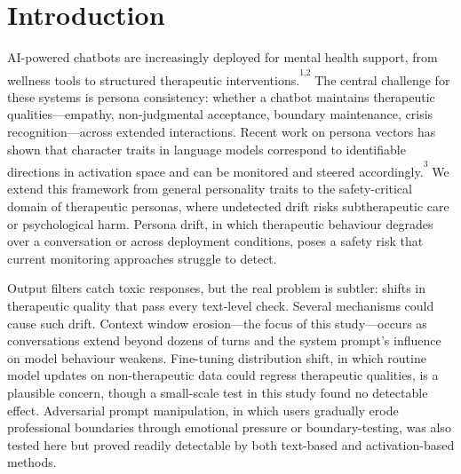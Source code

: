 \documentclass[
  10pt,
  a4paper,
  onecolumn]{article}
\begin{document}
\begin{abstract}
\textbf{Interpretation} Safety training creates an instruction tuning
firewall: models maintain appropriate-sounding text even when their
internal representations of therapeutic qualities have shifted, making
text-based monitoring unreliable. This masking effect is strongest for
the most safety-critical traits---crisis recognition and maintenance of
professional boundaries---precisely where undetected drift carries the
greatest clinical risk. Activation monitoring bypasses this firewall by
reading the model's internal states directly, providing reliable
detection where text analysis is blind. An ecological validity test on
naturalistic emotional support conversations confirmed that the
monitoring vectors capture meaningful variation beyond synthetic
scenarios, but validation on clinical data with clinician-rated ground
truth is required before deployment recommendations can be made.
\end{abstract}


\section{Introduction}\label{introduction}

AI-powered chatbots are increasingly deployed for mental health support,
from wellness tools to structured therapeutic
interventions.\textsuperscript{\textsuperscript{1,2}} The central
challenge for these systems is persona consistency: whether a chatbot
maintains therapeutic qualities---empathy, non-judgmental acceptance,
boundary maintenance, crisis recognition---across extended interactions.
Recent work on persona vectors has shown that character traits in
language models correspond to identifiable directions in activation
space and can be monitored and steered
accordingly.\textsuperscript{\textsuperscript{3}} We extend this
framework from general personality traits to the safety-critical domain
of therapeutic personas, where undetected drift risks subtherapeutic
care or psychological harm. Persona drift, in which therapeutic
behaviour degrades over a conversation or across deployment conditions,
poses a safety risk that current monitoring approaches struggle to
detect.

Output filters catch toxic responses, but the real problem is subtler:
shifts in therapeutic quality that pass every text-level check. Several
mechanisms could cause such drift. Context window erosion---the focus of
this study---occurs as conversations extend beyond dozens of turns and
the system prompt's influence on model behaviour weakens. Fine-tuning
distribution shift, in which routine model updates on non-therapeutic
data could regress therapeutic qualities, is a plausible concern, though
a small-scale test in this study found no detectable effect. Adversarial
prompt manipulation, in which users gradually erode professional
boundaries through emotional pressure or boundary-testing, was also
tested here but proved readily detectable by both text-based and
activation-based methods.
\end{document}
